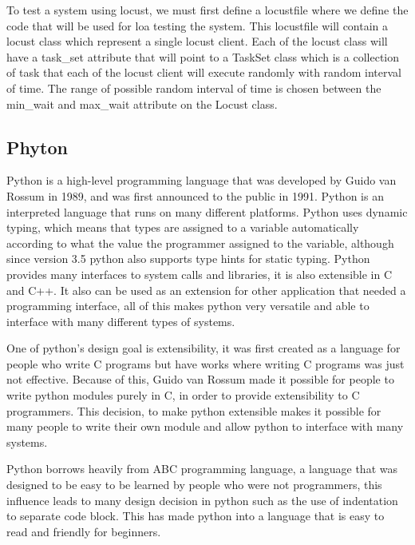 To test a system using locust, we must first define a locustfile where we define the code that will be used for loa testing the system. This locustfile will contain a locust class which represent a single locust client. Each of the locust class will have a task\_set attribute that will point to a TaskSet class which is a collection of task that each of the locust client will execute randomly with random interval of time. The range of possible random interval of time is chosen between the min\_wait and max\_wait attribute on the Locust class. 

\cite{locustDoc}

\subsection{Phyton}
Python is a high-level programming language that was developed by Guido van Rossum in 1989, and was first announced to the public in 1991. Python is an interpreted language that runs on many different platforms. Python uses dynamic typing, which means that types are assigned to a variable automatically according to what the value the programmer assigned to the variable, although since version 3.5 python also supports type hints for static typing. Python provides many interfaces to system calls and libraries, it is also extensible in C and C++. It also can be used as an extension for other application that needed a programming interface, all of this makes python very versatile and able to interface with many different types of systems. \cite{phytonFAQ}

One of python's design goal is extensibility, it was first created as a language for people who write C programs but have works where writing C programs was just not effective. Because of this, Guido van Rossum made it possible for people to write python modules purely in C, in order to provide extensibility to C programmers. This decision, to make python extensible makes it possible for many people to write their own module and allow python to interface with many systems. \cite{phytonDesignGoals}

Python borrows heavily from ABC programming language, a language that was designed to be easy to be learned by people who were not programmers, this influence leads to many design decision in python such as the use of indentation to separate code block. This has made python into a language that is easy to read and friendly for beginners. \cite{makingOfPhyton}